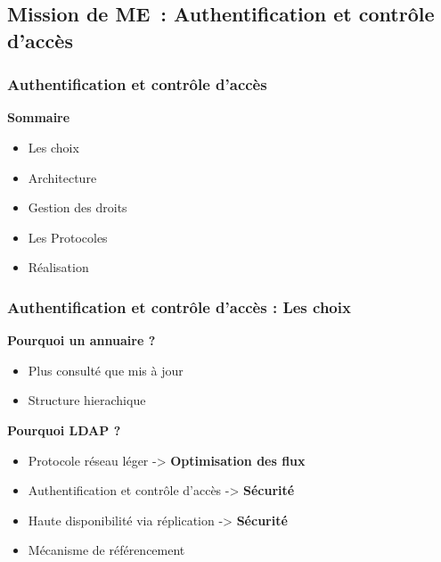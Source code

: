 \subsection{Mission de ME~: Authentification et contrôle d'accès}
\begin{frame}
  \frametitle{Authentification et contrôle d'accès}
  \begin{block}{\textbf{ Sommaire }}
  \begin{itemize}
  \item Les choix
  \item Architecture
  \item Gestion des droits
  \item Les Protocoles
  \item Réalisation
  \end{itemize}
  \end{block}
\end{frame}

\begin{frame}
  \frametitle{Authentification et contrôle d'accès : Les choix}
  \begin{block}{\textbf{Pourquoi un annuaire ? }}
  \begin{itemize}
  \item Plus consulté que mis à jour
  \item Structure hierachique 
  \end{itemize} 
  \end{block}
  
  \begin{block}{\textbf{Pourquoi LDAP ? }}
  \begin{itemize}
  \item Protocole réseau léger -> \textbf{Optimisation des flux
}
  \item Authentification et contrôle d'accès -> \textbf{Sécurité}
  \item Haute disponibilité via réplication  -> \textbf{Sécurité}
  \item Mécanisme de référencement
  \end{itemize}
  \end{block}
\end{frame}

